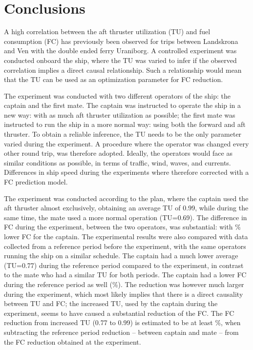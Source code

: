 \section{Conclusions}
A high correlation between the aft thruster utilization (TU) and fuel consumption (FC) has previously been observed for trips between Landskrona and Ven with the double ended ferry Uraniborg.  A controlled experiment was conducted onboard the ship, where the TU was varied to infer if the observed correlation implies a direct causal relationship. Such a relationship would mean that the TU can be used as an optimization parameter for FC reduction.

The experiment was conducted with two different operators of the ship: the captain and the first mate. The captain was instructed to operate the ship in a new way: with as much aft thruster utilization as possible; the first mate was instructed to run the ship in a more normal way: using both the forward and aft thruster.
To obtain a reliable inference, the TU needs to be the only parameter varied during the experiment. A procedure where the operator was changed every other round trip, was therefore adopted. Ideally, the operators would face as similar conditions as possible, in terms of traffic, wind, waves, and currents.
Differences in ship speed during the experiments where therefore corrected with a FC prediction model.

The experiment was conducted according to the plan, where the captain used the aft thruster almost exclusively, obtaining an average TU of 0.99, while during the same time, the mate used a more normal operation (TU=0.69). The difference in FC during the experiment, between the two operators, was substantial: with \savingpctexperiment \% lower FC for the captain. 
The experimental results were also compared with data collected from a reference period before the experiment, with the same operators running the ship on a similar schedule. The captain had a much lower average (TU=0.77) during the reference period compared to the experiment, in contrast to the mate who had a similar TU for both periods. The captain had a lower FC during the reference period as well (\savingpctbeforeexperiment \%).
The reduction was however much larger during the experiment, which most likely implies that there is a direct causality between TU and FC; the increased TU, used by the captain during the experiment, seems to have caused a substantial reduction of the FC. The FC reduction from increased TU (0.77 to 0.99) is estimated to be at least \savingthrusterallocationpct \%, when subtracting the reference period reduction -- between captain and mate -- from the FC reduction obtained at the experiment. 

